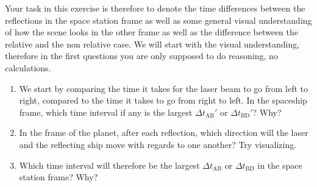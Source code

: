 {\begin{multicols}{2}
Your task in this exercise is therefore to denote the time differences between the reflections in the space station frame as well as some general visual understanding of how the scene looks in the other frame as well as the difference between the relative and the non relative case. We will start with the visual understanding, therefore in the first questions you are only supposed to do reasoning, no calculations.

\begin{enumerate}

\item We start by comparing the time it takes for the laser beam to go from left to right, compared to the time it takes to go from right to left. In the spaceship frame, which time interval if any is the largest $\Delta t_\mathrm{AB}'$ or $\Delta t_\mathrm{BD}'$? Why?

\item In the frame of the planet, after each reflection, which direction will the laser and the reflecting ship move with regards to one another? Try visualizing.

\item Which time interval will therefore be the largest $\Delta t_\mathrm{AB}$ or $\Delta t_\mathrm{BD}$ in the space station frame? Why? 


\end{enumerate}
\end{multicols}}
